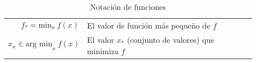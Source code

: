 \begin{table}[H]
\begin{center}
\begin{tabularx}{\textwidth}{|r|X|}
            $ f_{*} = \text{min}_x~f(x) $                                                                                                                                                                                                     & El valor de función más pequeño de $f$                                                                \\
            $ {x}_x \in \text{arg min}_{x}~f(x) $                                                                                                                                                                                             & El valor $x_{*}$ (conjunto de valores) que minimiza $f$                                               \\
            \hline
        \end{tabularx}
        \caption{Notación de funciones}
        \label{tab:notation-part-functions}
    \end{center}
\end{table}


